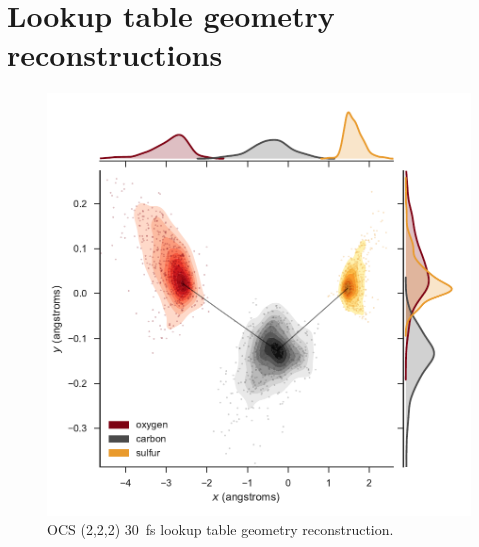 \section{Lookup table geometry reconstructions}

\begin{figure}
  \centering
  \includegraphics[width=\textwidth]{Plots/OCS22230fsLTGeometry}
  \caption[OCS (2,2,2) \SI{30}{\fs} lookup table geometry reconstruction.]
  {OCS (2,2,2) \SI{30}{\fs} lookup table geometry reconstruction.}
  \label{fig:OCS22230fsLTGeometry}
\end{figure}

